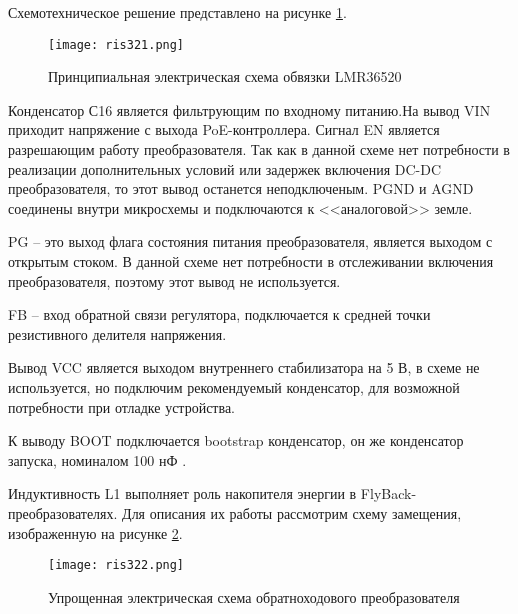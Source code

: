 Схемотехническое решение представлено на рисунке \ref{ris:321}.

\begin{figure}[H]
    \centering
    \texttt{[image: ris321.png]}
    \caption{Принципиальная электрическая схема обвязки LMR36520}
    \label{ris:321}
\end{figure}

Конденсатор С16 является фильтрующим по входному питанию.На вывод VIN приходит напряжение
с выхода PoE-контроллера. Сигнал EN является разрешающим работу преобразователя. Так как
в данной схеме нет потребности в реализации дополнительных условий или задержек включения
DC-DC преобразователя, то этот вывод останется неподключеным. PGND и AGND соединены внутри 
микросхемы и подключаются к <<аналоговой>> земле. 

PG -- это выход флага состояния питания преобразователя, является выходом с открытым стоком. 
В данной схеме нет потребности в отслеживании включения преобразователя, поэтому этот вывод не 
используется. 

FB -- вход обратной связи регулятора, подключается к средней точки резистивного делителя
напряжения.

Вывод VCC является выходом внутреннего стабилизатора на 5 В, в схеме не используется, но подключим
рекомендуемый конденсатор, для возможной потребности при отладке устройства.

К выводу BOOT подключается bootstrap конденсатор, он же конденсатор запуска, номиналом 100 нФ 
\cite{LMR36520:datasheet}. 

Индуктивность L1 выполняет роль накопителя энергии в FlyBack-преобразователях.
Для описания их работы рассмотрим схему замещения, изображенную на рисунке \ref{ris:322}.

\begin{figure}[H]
    \centering
    \texttt{[image: ris322.png]}
    \caption{Упрощенная электрическая схема обратноходового преобразователя}
    \label{ris:322}
\end{figure}

